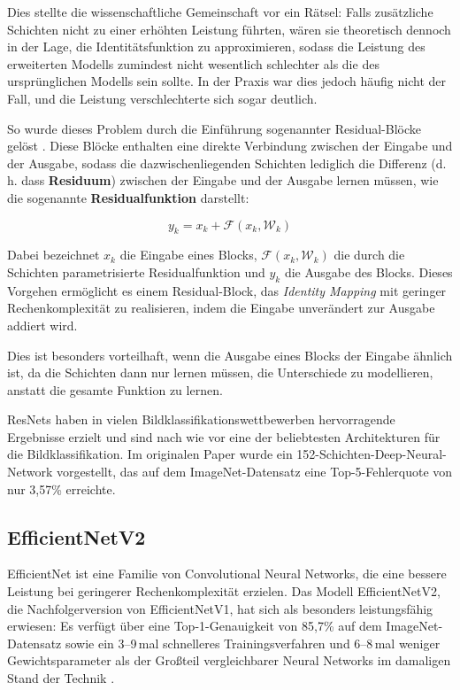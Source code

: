Dies stellte die wissenschaftliche Gemeinschaft vor ein Rätsel: Falls zusätzliche Schichten nicht zu einer erhöhten Leistung führten, wären sie theoretisch dennoch in der Lage, die Identitätsfunktion zu approximieren, sodass die Leistung des erweiterten Modells zumindest nicht wesentlich schlechter als die des ursprünglichen Modells sein sollte. In der Praxis war dies jedoch häufig nicht der Fall, und die Leistung verschlechterte sich sogar deutlich.

So wurde dieses Problem durch die Einführung sogenannter Residual-Blöcke gelöst \cite{he2016resnet}. Diese Blöcke enthalten eine direkte Verbindung zwischen der Eingabe und der Ausgabe, sodass die dazwischenliegenden Schichten lediglich die Differenz (d.\, h. dass \textbf{Residuum}) zwischen der Eingabe und der Ausgabe lernen müssen, wie die sogenannte \textbf{Residualfunktion} darstellt:

\begin{equation}
    y_k = x_k + \mathcal{F}(x_k, \mathcal{W}_k)
\end{equation}

Dabei bezeichnet $x_k$ die Eingabe eines Blocks, $\mathcal{F}(x_k, \mathcal{W}_k)$ die durch die Schichten parametrisierte Residualfunktion und $y_k$ die Ausgabe des Blocks. Dieses Vorgehen ermöglicht es einem Residual-Block, das \textit{Identity Mapping} mit geringer Rechenkomplexität zu realisieren, indem die Eingabe unverändert zur Ausgabe addiert wird.

Dies ist besonders vorteilhaft, wenn die Ausgabe eines Blocks der Eingabe ähnlich ist, da die Schichten dann nur lernen müssen, die Unterschiede zu modellieren, anstatt die gesamte Funktion zu lernen.

ResNets haben in vielen Bildklassifikationswettbewerben hervorragende Ergebnisse erzielt und sind nach wie vor eine der beliebtesten Architekturen für die Bildklassifikation. Im originalen Paper \cite{he2016resnet} wurde ein 152-Schichten-Deep-Neural-Network vorgestellt, das auf dem ImageNet-Datensatz eine Top-5-Fehlerquote von nur 3,57\% erreichte.

\subsection{EfficientNetV2}

EfficientNet ist eine Familie von Convolutional Neural Networks, die eine bessere Leistung bei geringerer Rechenkomplexität erzielen. Das Modell EfficientNetV2, die Nachfolgerversion von EfficientNetV1, hat sich als besonders leistungsfähig erwiesen: Es verfügt über eine Top-1-Genauigkeit von 85,7\% auf dem ImageNet-Datensatz sowie ein 3--9\,mal schnelleres Trainingsverfahren und 6--8\,mal weniger Gewichtsparameter als der Großteil vergleichbarer Neural Networks im damaligen Stand der Technik \cite{tan2021efficientnetv2}.

